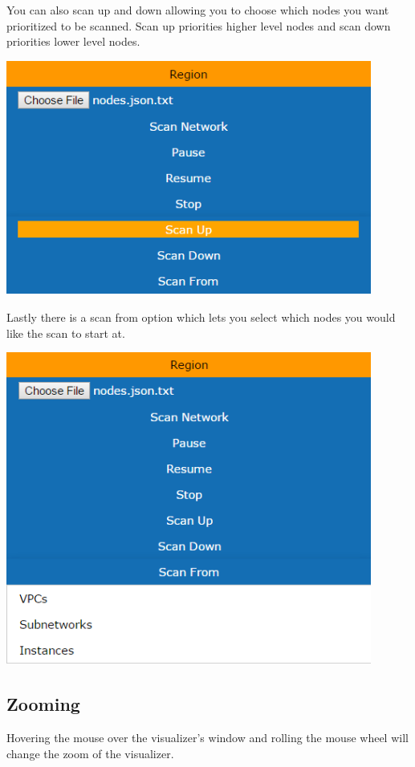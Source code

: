 \documentclass[hidelinks,a4paper,12pt]{article}
\begin{document}
	You can also scan up and down allowing you to choose which nodes you want prioritized to be scanned. Scan up priorities higher level nodes and scan down priorities lower level nodes. 
	
	\includegraphics[width=0.9\textwidth]{./images/Visualizer5.png}
	
	Lastly there is a scan from option which lets you select which nodes you would like the scan to start at. 
	
	\includegraphics[width=0.9\textwidth]{./images/Visualizer6.png}
	\newpage
	
	\subsection{Zooming}
	Hovering the mouse over the visualizer's window and rolling the mouse wheel will change the zoom of the visualizer. 
	
\end{document}
